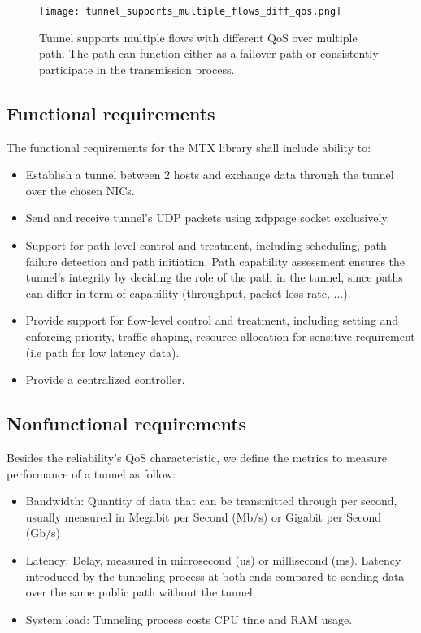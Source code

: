 \begin{figure}[H]
	\centering
	\texttt{[image: tunnel\_supports\_multiple\_flows\_diff\_qos.png]}
	\caption{Tunnel supports multiple flows with different QoS over multiple path. The path can function either as a failover path or consistently participate in the transmission process.}\label{fig:reqs:tunnel_supports_multiple_flows_diff_qos}
\end{figure}

\subsection{Functional requirements}
The functional requirements for the \ac{MTX} library shall include ability to:
\begin{itemize}
    \item Establish a tunnel between 2 hosts and exchange data through the tunnel over the chosen \ac{NIC}s.
    \item Send and receive tunnel's UDP packets using \ac{xdppage} socket exclusively.
    \item Support for path-level control and treatment, including scheduling, path failure detection and path initiation.
    Path capability assessment ensures the tunnel's integrity by deciding the role of the path in the tunnel, since paths can differ in term of capability (throughput, packet loss rate, ...).
    \item Provide support for flow-level control and treatment, including setting and enforcing priority, traffic shaping, resource allocation for sensitive requirement (i.e path for low latency data).
    \item Provide a centralized controller.
\end{itemize}

\subsection{Nonfunctional requirements}
Besides the reliability's \ac{QoS} characteristic, we define the metrics to measure performance of a tunnel as follow:
\begin{itemize}
    \item Bandwidth: Quantity of data that can be transmitted through per second, usually measured in Megabit per Second (Mb/s) or Gigabit  per Second (Gb/s)
    \item Latency: Delay, measured in microsecond (us) or millisecond (ms). Latency introduced by the tunneling process at both ends compared to sending data over the same public path without the tunnel.
    \item System load: Tunneling process costs CPU time and RAM usage.
\end{itemize}

